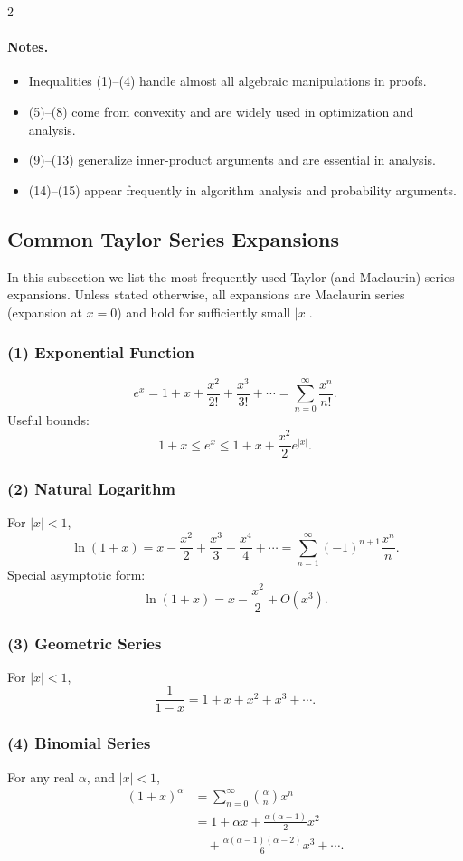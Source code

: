 \documentclass[8pt]{extarticle}
\theoremstyle{definition}
\begin{document}
\begin{multicols*}{2}
\paragraph{Notes.}
\begin{itemize}
    \item Inequalities (1)--(4) handle almost all algebraic manipulations in proofs.
    \item (5)--(8) come from convexity and are widely used in optimization and analysis.
    \item (9)--(13) generalize inner-product arguments and are essential in analysis.
    \item (14)--(15) appear frequently in algorithm analysis and probability arguments.
\end{itemize}
\subsection{Common Taylor Series Expansions}

In this subsection we list the most frequently used Taylor (and Maclaurin)
series expansions.  Unless stated otherwise, all expansions are Maclaurin
series (expansion at \(x=0\)) and hold for sufficiently small \(|x|\).

\subsubsection*{(1) Exponential Function}
\[
e^x
    = 1 + x + \frac{x^2}{2!} + \frac{x^3}{3!} + \cdots
    = \sum_{n=0}^\infty \frac{x^n}{n!}.
\]
Useful bounds:
\[
1+x \le e^x \le 1 + x + \frac{x^2}{2}e^{|x|}.
\]

\subsubsection*{(2) Natural Logarithm}
For \(|x|<1\),
\[
\ln(1+x)
    = x - \frac{x^2}{2} + \frac{x^3}{3} - \frac{x^4}{4} + \cdots
    = \sum_{n=1}^\infty (-1)^{n+1}\frac{x^n}{n}.
\]
Special asymptotic form:
\[
\ln(1+x) = x - \frac{x^2}{2} + O(x^3).
\]

\subsubsection*{(3) Geometric Series}
For \(|x|<1\),
\[
\frac{1}{1-x}
    = 1 + x + x^2 + x^3 + \cdots.
\]

\subsubsection*{(4) Binomial Series}
For any real \(\alpha\), and \(|x|<1\),
\[
\begin{aligned}
(1+x)^\alpha
    &= \sum_{n=0}^{\infty}
      \binom{\alpha}{n} x^n
    \\
    &= 1 + \alpha x + \frac{\alpha(\alpha-1)}{2}x^2\\
    &\quad+ \frac{\alpha(\alpha-1)(\alpha-2)}{6}x^3 + \cdots.
\end{aligned}
\]


\end{multicols*}
\end{document}
